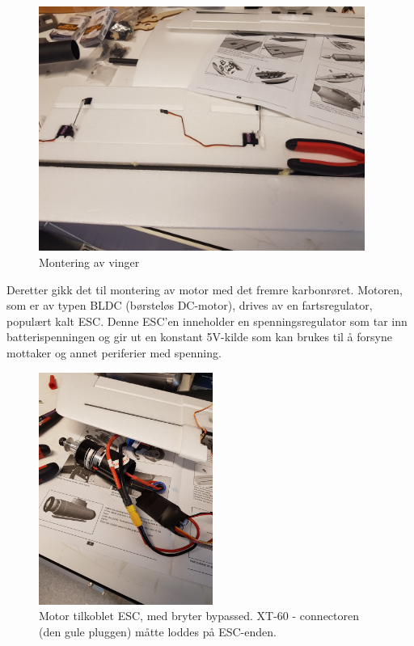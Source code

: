\documentclass[12pt, a4paper]{article}
\begin{document}
\begin{figure}[ht]
	\centering
	\includegraphics[width=.6\textwidth,  height = 8cm]{bilder/vingemontering.jpg}
	\caption{Montering av vinger}
\end{figure}

\newpage
Deretter gikk det til montering av motor med det fremre karbonrøret. Motoren, som er av typen BLDC (børsteløs DC-motor), drives av en fartsregulator, populært kalt ESC. Denne ESC'en inneholder en spenningsregulator som tar inn batterispenningen og gir ut en konstant 5V-kilde som kan brukes til å forsyne mottaker og annet periferier med spenning. 

\begin{figure}[ht]
	\centering
	\includegraphics[height=7.6cm, width = .55\textwidth]{bilder/esc_og_motor.jpg}
	\caption[Observer-motor]{Motor tilkoblet ESC, med bryter bypassed. XT-60 - connectoren (den gule pluggen) måtte loddes på ESC-enden.}
\end{figure}
\end{document}
